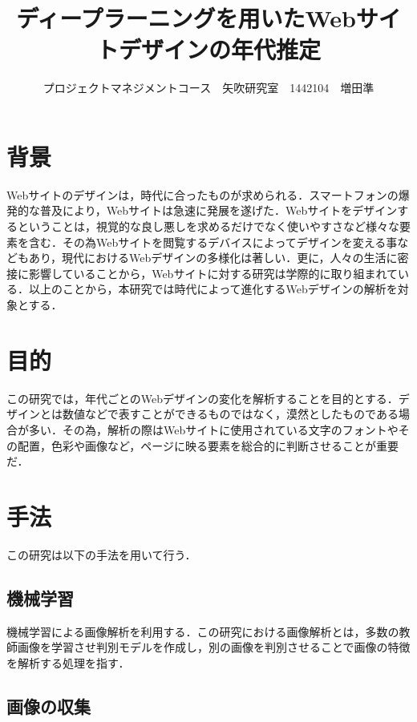 \documentclass[uplatex,twocolumn,dvipdfmx]{jsarticle}
\title{\vspace{-5mm}\fontsize{14pt}{0pt}\selectfont ディープラーニングを用いたWebサイトデザインの年代推定}
\author{\normalsize プロジェクトマネジメントコース　矢吹研究室　1442104　増田準}
\date{}
\begin{document}
\fontsize{10.5pt}{\baselineskip}\selectfont
\maketitle





\section{背景}

Webサイトのデザインは，時代に合ったものが求められる\cite{bib001}．スマートフォンの爆発的な普及により，Webサイトは急速に発展を遂げた．Webサイトをデザインするということは，視覚的な良し悪しを求めるだけでなく使いやすさなど様々な要素を含む．その為Webサイトを閲覧するデバイスによってデザインを変える事などもあり，現代におけるWebデザインの多様化は著しい．更に，人々の生活に密接に影響していることから，Webサイトに対する研究は学際的に取り組まれている\cite{bib002}．以上のことから，本研究では時代によって進化するWebデザインの解析を対象とする．

\section{目的}

この研究では，年代ごとのWebデザインの変化を解析することを目的とする．デザインとは数値などで表すことができるものではなく，漠然としたものである場合が多い．その為，解析の際はWebサイトに使用されている文字のフォントやその配置，色彩や画像など，ページに映る要素を総合的に判断させることが重要だ．

\section{手法}

この研究は以下の手法を用いて行う．

\subsection{機械学習}

機械学習による画像解析を利用する．この研究における画像解析とは，多数の教師画像を学習させ判別モデルを作成し，別の画像を判別させることで画像の特徴を解析する処理を指す．


\subsection{画像の収集}
\end{document}
